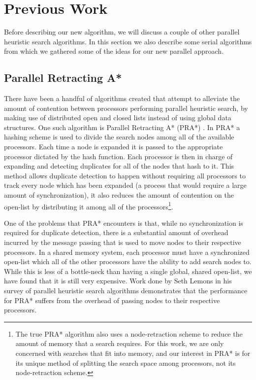 \documentclass{article}
\begin{document}
 \section{Previous Work}

 Before describing our new algorithm, we will discuss a couple of other
 parallel heuristic search algorithms.  In this section we also
 describe some serial algorithms from which we gathered some of the
 ideas for our new parallel approach.

 \subsection{Parallel Retracting A*}

 There have been a handful of algorithms created that attempt to
 alleviate the amount of contention between processors performing
 parallel heuristic search, by making use of distributed open and
 closed lists instead of using global data structures.  One such
 algorithm is Parallel Retracting A* (PRA*) \cite{evett:pra}.  In PRA*
 a hashing scheme is used to divide the search nodes among all of the
 available processors.  Each time a node is expanded it is passed to
 the appropriate processor dictated by the hash function.  Each
 processor is then in charge of expanding and detecting duplicates for
 all of the nodes that hash to it.  This method allows duplicate
 detection to happen without requiring all processors to track every
 node which has been expanded (a process that would require a large
 amount of synchronization), it also reduces the amount of contention
 on the open-list by distributing it among all of the
 processors\footnote{The true PRA* algorithm also uses a
   node-retraction scheme to reduce the amount of memory that a search
   requires.  For this work, we are only concerned with searches that
   fit into memory, and our interest in PRA* is for its unique method
   of splitting the search space among processors, not its
   node-retraction scheme.}.

 One of the problems that PRA* encounters is that, while no
 synchronization is required for duplicate detection, there is a
 substantial amount of overhead incurred by the message passing that is
 used to move nodes to their respective processors.  In a shared memory
 system, each processor must have a synchronized open-list which all of
 the other processors have the ability to add search nodes to.  While
 this is less of a bottle-neck than having a single global, shared
 open-list, we have found that it is still very expensive.  Work done
 by Seth Lemons in his survey of parallel heuristic search algorithms
 \cite{lemons:sur} demonstrates that the performance for PRA* suffers
 from the overhead of passing nodes to their respective processors.
\end{document}
